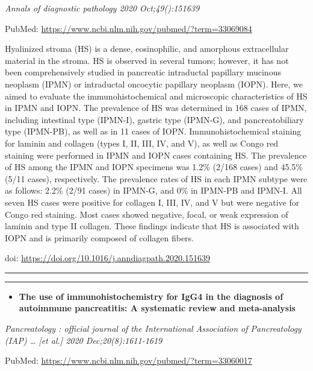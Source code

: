 \documentclass[
]{article}
\providecommand{\tightlist}{%
  \setlength{\itemsep}{0pt}\setlength{\parskip}{0pt}}
\begin{document}
\emph{Annals of diagnostic pathology 2020 Oct;49():151639}

PubMed: \url{https://www.ncbi.nlm.nih.gov/pubmed/?term=33069084}

Hyalinized stroma (HS) is a dense, eosinophilic, and amorphous
extracellular material in the stroma. HS is observed in several tumors;
however, it has not been comprehensively studied in pancreatic
intraductal papillary mucinous neoplasm (IPMN) or intraductal oncocytic
papillary neoplasm (IOPN). Here, we aimed to evaluate the
immunohistochemical and microscopic characteristics of HS in IPMN and
IOPN. The prevalence of HS was determined in 168 cases of IPMN,
including intestinal type (IPMN-I), gastric type (IPMN-G), and
pancreatobiliary type (IPMN-PB), as well as in 11 cases of IOPN.
Immunohistochemical staining for laminin and collagen (types I, II, III,
IV, and V), as well as Congo red staining were performed in IPMN and
IOPN cases containing HS. The prevalence of HS among the IPMN and IOPN
specimens was 1.2\% (2/168 cases) and 45.5\% (5/11 cases), respectively.
The prevalence rates of HS in each IPMN subtype were as follows: 2.2\%
(2/91 cases) in IPMN-G, and 0\% in IPMN-PB and IPMN-I. All seven HS
cases were positive for collagen I, III, IV, and V but were negative for
Congo red staining. Most cases showed negative, focal, or weak
expression of laminin and type II collagen. These findings indicate that
HS is associated with IOPN and is primarily composed of collagen fibers.

doi: \url{https://doi.org/10.1016/j.anndiagpath.2020.151639}

\begin{center}\rule{0.5\linewidth}{0.5pt}\end{center}

\begin{center}\rule{0.5\linewidth}{0.5pt}\end{center}

\begin{itemize}
\tightlist
\item
  \textbf{The use of immunohistochemistry for IgG4 in the diagnosis of
  autoimmune pancreatitis: A systematic review and meta-analysis}
\end{itemize}

\emph{Pancreatology : official journal of the International Association
of Pancreatology (IAP) \ldots{} {[}et al.{]} 2020 Dec;20(8):1611-1619}

PubMed: \url{https://www.ncbi.nlm.nih.gov/pubmed/?term=33060017}
\end{document}
